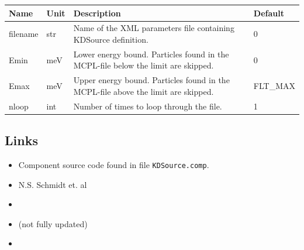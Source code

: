 \begin{longtable}{p{}p{}p{}p{}}
\toprule
\textbf{Name} & \textbf{Unit} & \textbf{Description} & \textbf{Default} \\
\midrule
\endhead
filename & str & Name of the XML parameters file containing KDSource definition. & 0 \\
Emin & meV & Lower energy bound. Particles found in the MCPL-file below the limit are skipped. & 0 \\
Emax & meV & Upper energy bound. Particles found in the MCPL-file above the limit are skipped. & FLT\_MAX \\
nloop & int & Number of times to loop through the file. & 1 \\
\bottomrule
\end{longtable}

\subsection*{Links}
\begin{itemize}
  \item Component source code found in file \texttt{KDSource.comp}.
  \item N.S. Schmidt et. al 
  \item {}
  \item {} (not fully updated)
  \item {}
\end{itemize}
